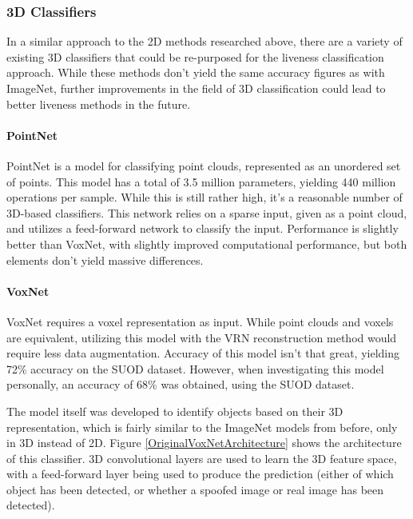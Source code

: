 \documentclass[10pt,a4paper]{article}
\begin{document}
        \subsubsection{3D Classifiers}
            In a similar approach to the 2D methods researched above, there are a variety of existing 3D classifiers that could be re-purposed for the liveness classification approach.
            While these methods don't yield the same accuracy figures as with ImageNet, further improvements in the field of 3D classification could lead to better liveness methods in the future.

            \paragraph{PointNet}
            PointNet is a model for classifying point clouds, represented as an unordered set of points. This model has a total of 3.5 million parameters, yielding 440 million operations per sample. 
            While this is still rather high, it's a reasonable number of 3D-based classifiers. This network relies on a sparse input, given as a point cloud, and utilizes a feed-forward network to classify the input.
            Performance is slightly better than VoxNet, with slightly improved computational performance, but both elements don't yield massive differences. \cite{PointNet}
            \paragraph{VoxNet}
            VoxNet requires a voxel representation as input. While point clouds and voxels are equivalent, utilizing this model with the VRN reconstruction method would require less data augmentation. Accuracy of this model isn't that great, yielding 72\% accuracy on the SUOD dataset. \cite{VoxNetModel} However, when investigating this model personally, an accuracy of 68\% was obtained, using the SUOD dataset. 

            The model itself was developed to identify objects based on their 3D representation, which is fairly similar to the ImageNet models from before, only in 3D instead of 2D. 
            Figure \ref{OriginalVoxNetArchitecture} shows the architecture of this classifier. 3D convolutional layers are used to learn the 3D feature space, with a feed-forward layer
            being used to produce the prediction (either of which object has been detected, or whether a spoofed image or real image has been detected).
\end{document}
